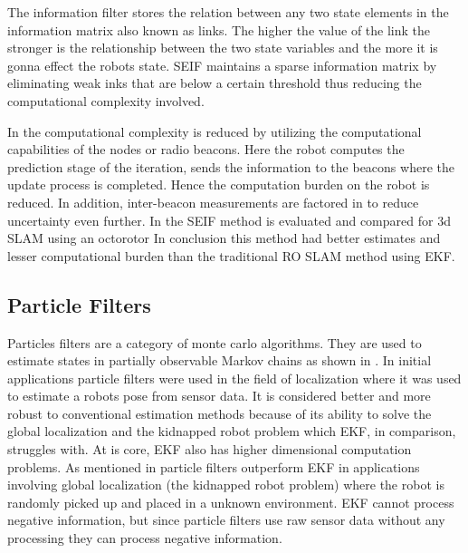 \documentclass[conference]{IEEEtran}
\begin{document}
The information filter stores the relation between any two state elements in the information matrix also known as links. The higher the value of the link the stronger is the relationship between the two state variables and the more it is gonna effect the robots state. SEIF maintains a sparse information matrix by eliminating weak inks that are below a certain threshold thus reducing the computational complexity involved.

In \cite{Torres-Gonzalez2014} the computational complexity is reduced by utilizing the computational capabilities of the nodes or radio  beacons. Here the robot computes the prediction stage of the iteration, sends the information to the beacons where the update process is completed. Hence the computation burden on the robot is reduced. In addition, inter-beacon measurements are factored in to reduce uncertainty even further. In \cite{Torres-Gonzalez2017} the SEIF method is evaluated and compared for 3d SLAM using an octorotor In conclusion this method had better estimates and lesser computational burden than the traditional RO SLAM method using EKF. 



	
	
	

	
\subsection{Particle Filters}      %
Particles filters are a category of monte carlo algorithms. They are used to estimate states in partially observable Markov chains as shown in \cite{Doucet2001}. In  initial applications particle filters were used in the field of localization where it was used to estimate a robots pose from sensor data. It is considered better and more robust to conventional estimation methods because of its ability to solve the global localization \cite{Borenstein1996} and the kidnapped robot problem \cite{Engelson1992} which EKF, in comparison, struggles with. At is core, EKF also has higher dimensional computation problems.
As mentioned in \cite{Thrun2002a} particle filters outperform EKF in applications involving global localization (the kidnapped robot problem) where the robot is randomly picked up and placed in a unknown environment. 
EKF cannot process negative information, but since particle filters use raw sensor data without any processing they can process negative information\cite{Thrun2002a}. 
\end{document}
